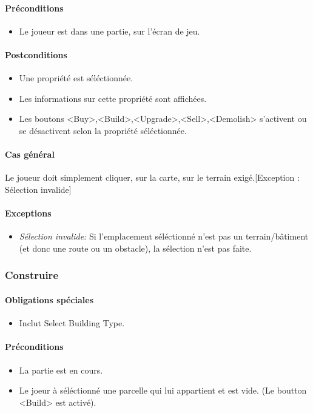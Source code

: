 \documentclass[a4paper,11pt]{report}
\begin{document}
\paragraph{Préconditions}
\begin{itemize}
	\item Le joueur est dans une partie, sur l'écran de jeu.
\end{itemize}
\paragraph{Postconditions}
\begin{itemize}
	\item Une propriété est séléctionnée.
	\item Les informations sur cette propriété sont affichées.
	\item Les boutons <Buy>,<Build>,<Upgrade>,<Sell>,<Demolish> s'activent ou se désactivent selon la propriété séléctionnée.
\end{itemize}
\paragraph{Cas général}
Le joueur doit simplement cliquer, sur la carte, sur le terrain exigé.[Exception : Sélection invalide]
\paragraph{Exceptions}
\begin{itemize}
	\item \textit{Sélection invalide:} Si l'emplacement séléctionné n'est pas un terrain/bâtiment (et donc une route ou un obstacle), la sélection n'est pas faite.
\end{itemize}

\subsubsection{Construire}
\paragraph{Obligations spéciales}
\begin{itemize}
 \item Inclut Select Building Type.
\end{itemize}
\paragraph{Préconditions}
\begin{itemize}
 \item La partie est en cours.
 \item Le joeur à séléctionné une parcelle qui lui appartient et est vide. (Le boutton <Build> est activé).
\end{itemize}
\end{document}
